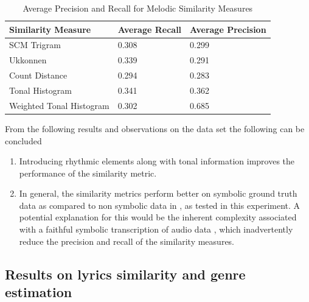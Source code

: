 \begin{table}[h]
\begin{center}
    \begin{tabular}{| l | l | l |}
    \hline
    Similarity Measure & Average Recall & Average Precision \\ \hline
    SCM Trigram & 0.308 & 0.299 \\ \hline
    Ukkonnen & 0.339 & 0.291 \\ \hline
    Count Distance & 0.294 & 0.283  \\ \hline
    Tonal Histogram & 0.341 & 0.362  \\ \hline
    Weighted Tonal Histogram & 0.302 & 0.685  \\ \hline
    \end{tabular}
\end{center}
\caption{Average Precision and Recall for Melodic Similarity Measures}
\end{table}

\noindent From the following results and observations on the data set the following can be concluded

\begin{enumerate}
\item Introducing rhythmic elements along with tonal information improves the performance of the similarity metric. 
\item In general, the similarity metrics perform better on symbolic ground truth data \cite{mirexsym} as compared to non symbolic data in \cite{msd}, as tested in this experiment. A potential explanation for this would be the inherent complexity associated with a faithful symbolic transcription of audio data \cite{melextract}, which inadvertently reduce the precision and recall of the similarity measures. 
\end{enumerate}

\subsection{Results on lyrics similarity and genre estimation} \label{genrelabels}

